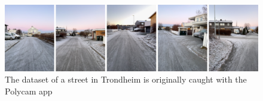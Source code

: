 \begin{figure}
    \centering
    \includegraphics[width=1.0\textwidth]{figures/streetview-dataset.png}
    \caption{The dataset of a street in Trondheim is originally caught with the Polycam app}
    \label{fig:streetview-dataset}
\end{figure}